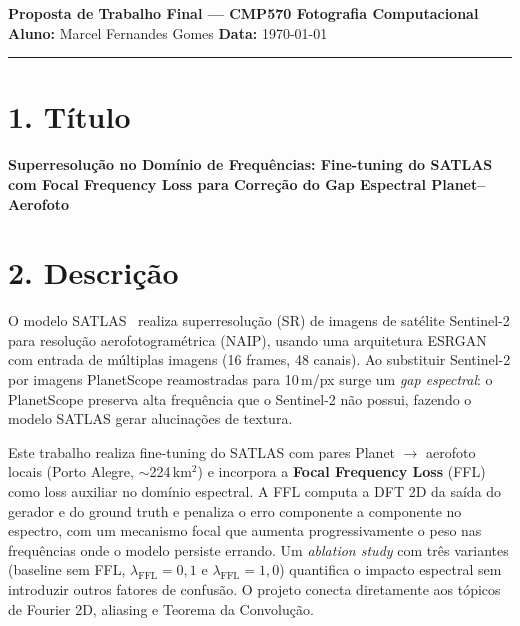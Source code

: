 \documentclass[12pt, a4paper]{article}
\begin{document}
\begin{center}
    {\large\textbf{Proposta de Trabalho Final --- CMP570 Fotografia Computacional}}\\[0.3em]
    {\normalsize\textbf{Aluno:} Marcel Fernandes Gomes \quad
     \textbf{Data:} \today}
\end{center}

\hrule
\vspace{0.6em}

\section*{1. Título}

\textbf{Superresolução no Domínio de Frequências: Fine-tuning do SATLAS com Focal Frequency
Loss para Correção do Gap Espectral Planet--Aerofoto}

\section*{2. Descrição}

O modelo SATLAS~\cite{satlassuperres} realiza superresolução (SR) de imagens de satélite
Sentinel-2 para resolução aerofotogramétrica (NAIP), usando uma arquitetura ESRGAN com
entrada de múltiplas imagens (16 frames, 48 canais). Ao substituir Sentinel-2 por imagens
PlanetScope reamostradas para 10\,m/px surge um \emph{gap espectral}: o PlanetScope preserva
alta frequência que o Sentinel-2 não possui, fazendo o modelo SATLAS gerar alucinações de textura.

Este trabalho realiza fine-tuning do SATLAS com pares Planet $\rightarrow$ aerofoto locais
(Porto Alegre, $\sim$224\,km$^2$) e incorpora a \textbf{Focal Frequency Loss}
(FFL)~\cite{jiang2021} como loss auxiliar no domínio espectral. A FFL computa a DFT 2D da
saída do gerador e do ground truth e penaliza o erro componente a componente no espectro,
com um mecanismo focal que aumenta progressivamente o peso nas frequências onde o modelo
persiste errando. Um \emph{ablation study} com três variantes (baseline sem FFL,
$\lambda_{\text{FFL}}=0{,}1$ e $\lambda_{\text{FFL}}=1{,}0$) quantifica o impacto espectral
sem introduzir outros fatores de confusão. O projeto conecta diretamente aos tópicos de
Fourier 2D, aliasing e Teorema da Convolução.

\end{document}

